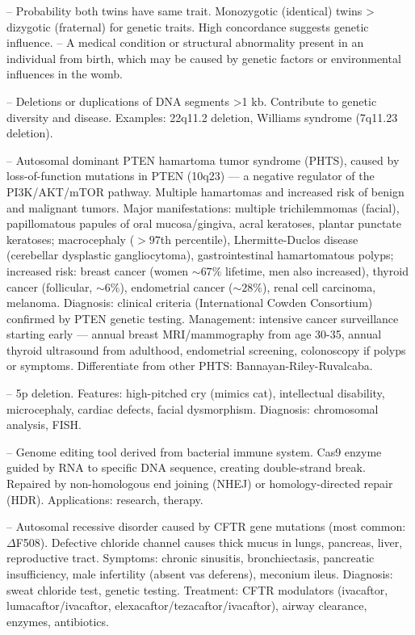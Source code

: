 -- Probability both twins have same trait. Monozygotic (identical) twins > dizygotic (fraternal) for genetic traits. High concordance suggests genetic influence.
-- A medical condition or structural abnormality present in an individual from birth, which may be caused by genetic factors or environmental influences in the womb.

-- Deletions or duplications of DNA segments >1 kb. Contribute to genetic diversity and disease. Examples: 22q11.2 deletion, Williams syndrome (7q11.23 deletion).

-- Autosomal dominant PTEN hamartoma tumor syndrome (PHTS), caused by loss-of-function mutations in PTEN (10q23) — a negative regulator of the PI3K/AKT/mTOR pathway. Multiple hamartomas and increased risk of benign and malignant tumors. Major manifestations: multiple trichilemmomas (facial), papillomatous papules of oral mucosa/gingiva, acral keratoses, plantar punctate keratoses; macrocephaly ($> 97$th percentile), Lhermitte-Duclos disease (cerebellar dysplastic gangliocytoma), gastrointestinal hamartomatous polyps; increased risk: breast cancer (women $\sim 67\%$ lifetime, men also increased), thyroid cancer (follicular, $\sim 6\%$), endometrial cancer ($\sim 28\%$), renal cell carcinoma, melanoma. Diagnosis: clinical criteria (International Cowden Consortium) confirmed by PTEN genetic testing. Management: intensive cancer surveillance starting early — annual breast MRI/mammography from age 30-35, annual thyroid ultrasound from adulthood, endometrial screening, colonoscopy if polyps or symptoms. Differentiate from other PHTS: Bannayan-Riley-Ruvalcaba.

-- 5p deletion. Features: high-pitched cry (mimics cat), intellectual disability, microcephaly, cardiac defects, facial dysmorphism. Diagnosis: chromosomal analysis, FISH.

-- Genome editing tool derived from bacterial immune system. Cas9 enzyme guided by RNA to specific DNA sequence, creating double-strand break. Repaired by non-homologous end joining (NHEJ) or homology-directed repair (HDR). Applications: research, therapy.

-- Autosomal recessive disorder caused by CFTR gene mutations (most common: $\Delta$F508). Defective chloride channel causes thick mucus in lungs, pancreas, liver, reproductive tract. Symptoms: chronic sinusitis, bronchiectasis, pancreatic insufficiency, male infertility (absent vas deferens), meconium ileus. Diagnosis: sweat chloride test, genetic testing. Treatment: CFTR modulators (ivacaftor, lumacaftor/ivacaftor, elexacaftor/tezacaftor/ivacaftor), airway clearance, enzymes, antibiotics.

